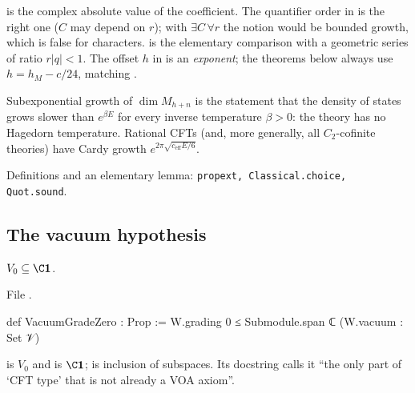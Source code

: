 \begin{dictionary}
 is the complex absolute value of the coefficient. The quantifier order in  is
the right one ($C$ may depend on $r$); with $\exists C\,\forall r$ the notion would be bounded growth, which is false for
characters. \allowbreak{} is the elementary comparison with a geometric series of ratio
$r|q|<1$. The offset $h$ in  is an \emph{exponent}; the theorems below always use
$h=h_M-c/24$, matching .
\end{dictionary}

\begin{physics}
Subexponential growth of $\dim M_{h+n}$ is the statement that the density of states grows slower than $e^{\beta E}$ for
every inverse temperature $\beta>0$: the theory has no Hagedorn temperature. Rational CFTs (and, more generally, all
$C_2$-cofinite theories) have Cardy growth $e^{2\pi\sqrt{c_{\mathrm{eff}}E/6}}$.
\end{physics}

\begin{status}
Definitions and an elementary lemma: \texttt{propext, Classical.choice, Quot.sound}.
\end{status}

\subsection{The vacuum hypothesis}

\begin{definition}\label{l15:def:vgz}
$V_0\subseteq\C\lfifteenvac$.
\end{definition}
\noindent File .
\begin{leancode}
def VacuumGradeZero : Prop := W.grading 0 ≤ Submodule.span ℂ ({W.vacuum} : Set 𝒱)
\end{leancode}

\begin{dictionary}
 is $V_0$ and  is $\C\lfifteenvac$;  is inclusion of subspaces.
Its docstring calls it ``the only part of `CFT type' that is not already a VOA axiom''.
\end{dictionary}


